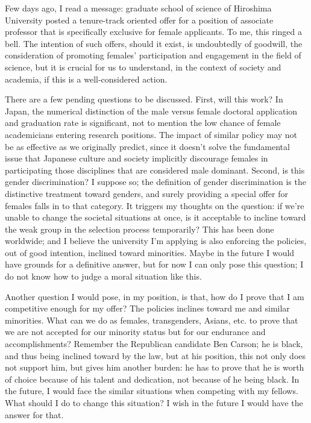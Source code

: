 \documentclass[10pt]{article}
\begin{document}
\begin{CJK*}{UTF8}{gbsn}
\newpage
Few days ago, I read a message: graduate school of science of Hiroshima University posted a tenure-track oriented offer for a position of associate professor that is specifically exclusive for female applicants. To me, this ringed a bell. The intention of such offers, should it exist, is undoubtedly of goodwill, the consideration of promoting females’ participation and engagement in the field of science, but it is crucial for us to understand, in the context of society and academia, if this is a well-considered action.

There are a few pending questions to be discussed. First, will this work?  In Japan, the numerical distinction of the male versus female doctoral application and graduation rate is significant, not to mention the low chance of female academicians entering research positions. The impact of similar policy may not be as effective as we originally predict, since it doesn’t solve the fundamental issue that Japanese culture and society implicitly discourage females in participating those disciplines that are considered male dominant. Second, is this gender discrimination? I suppose so; the definition of gender discrimination is the distinctive treatment toward genders, and surely providing a special offer for females falls in to that category. It triggers my thoughts on the question: if we’re unable to change the societal situations at once, is it acceptable to incline toward the weak group in the selection process temporarily? This has been done worldwide; and I believe the university I’m applying is also enforcing the policies, out of good intention, inclined toward minorities. Maybe in the future I would have grounds for a definitive answer, but for now I can only pose this question; I do not know how to judge a moral situation like this.

Another question I would pose, in my position, is that, how do I prove that I am competitive enough for my offer? The policies inclines toward me and similar minorities. What can we do as females, transgenders, Asians, etc. to prove that we are not accepted for our minority status but for our endurance and accomplishments? Remember the Republican candidate Ben Carson; he is black, and thus being inclined toward by the law, but at his position, this not only does not support him, but gives him another burden: he has to prove that he is worth of choice because of his talent and dedication, not because of he being black. In the future, I would face the similar situations when competing with my fellows. What should I do to change this situation? I wish in the future I would have the answer for that.


\end{CJK*}
\end{document}
